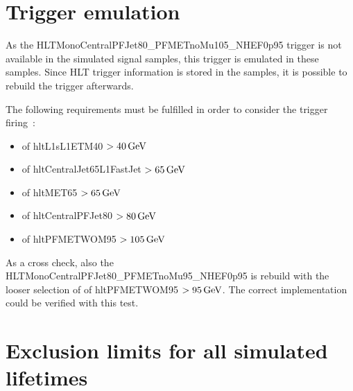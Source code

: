 \FloatBarrier
\section{Trigger emulation}
\label{app:TriggerEmulation}

As the HLTMonoCentralPFJet80\_PFMETnoMu105\_NHEF0p95 trigger is not available in the simulated signal samples, this trigger is emulated in these samples.
Since HLT trigger information is stored in the samples, it is possible to rebuild the trigger afterwards. 

The following requirements must be fulfilled in order to consider the trigger firing~\cite{bib:CMS:DT_Thesis,bib:CMS:DT_8TeV_AN}:
\begin{itemize}
\item \pt of hltL1sL1ETM40 $>40\,\text{Ge}\kern-0.06667em\text{V}$
\item \pt of hltCentralJet65L1FastJet $>65\,\text{Ge}\kern-0.06667em\text{V}$
\item \pt of hltMET65 $>65\,\text{Ge}\kern-0.06667em\text{V}$
\item \pt of hltCentralPFJet80 $>80\,\text{Ge}\kern-0.06667em\text{V}$
\item \pt of hltPFMETWOM95 $>105\,\text{Ge}\kern-0.06667em\text{V}$
\end{itemize}
As a cross check, also the HLTMonoCentralPFJet80\_PFMETnoMu95\_NHEF0p95 is rebuild with the looser selection of \pt of hltPFMETWOM95 $>95\,\text{Ge}\kern-0.06667em\text{V}$.
The correct implementation could be verified with this test.

\clearpage
\FloatBarrier
\section{Exclusion limits for all simulated lifetimes}
\label{app:ExlusionLimits}


